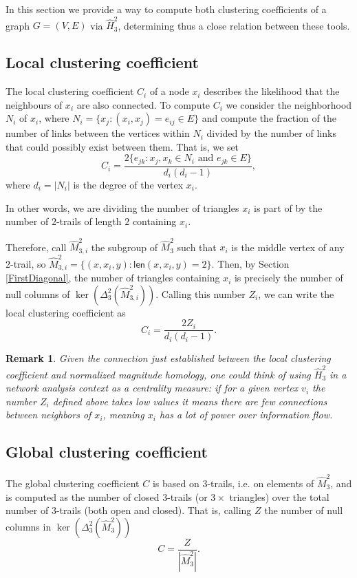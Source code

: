 \documentclass{article}
\newtheorem{remark}{Remark}
\newcommand{\len}{\textsf{len}}
\begin{document}
In this section we provide a way to compute both clustering coefficients of a graph $G=(V,E)$ via $\widehat{H}_3^2$, determining thus a close relation between these tools.


\subsection{Local clustering coefficient}

The local clustering coefficient $C_i$ of a node $x_i$ describes the likelihood that the neighbours of $x_i$ are also connected.
To compute $C_i$ we consider the neighborhood $N_i$ of $x_i$, where $N_i=\{x_j:(x_i,x_j)=e_{ij}\in E\}$ and compute the fraction of the number of links between the vertices within $N_i$ divided by the number of links that could possibly exist between them.
That is, we set
\[
C_i = \frac{2\{e_{jk}:x_j,x_k \in N_i \text{ and } e_{jk}\in E\}}{d_i(d_i -1)},
\]
where $d_i=|N_i|$ is the degree of the vertex $x_i$.

In other words, we are dividing the number of triangles $x_i$ is part of by the number of $2$-trails of length $2$ containing $x_i$.

Therefore, call $\widehat{M}_{3,i}^2$ the subgroup of $\widehat{M}_3^2$ such that $x_i$ is the middle vertex of any $2$-trail, so $\widehat{M}_{3,i}^2=\{(x,x_i,y): \len(x,x_i,y)=2\}$.
Then, by Section \ref{FirstDiagonal}, the number of triangles containing $x_i$ is precisely the number of null columns of $\ker(\Delta_3^2(\widehat{M}_{3,i}^2))$.
Calling this number $Z_i$, we can write the local clustering coefficient as
\[
C_i = \frac{2 Z_i}{d_i(d_i -1)}.
\]

\begin{remark}
	Given the connection just established between the local clustering coefficient and normalized magnitude homology, one could think of using $\widehat{H}_3^2$ in a network analysis context as a \emph{centrality measure}: if for a given vertex $v_i$ the number $Z_i$ defined above takes low values it means there are few connections between neighbors of $x_i$, meaning $x_i$ has a lot of power over information flow. 
\end{remark}


\subsection{Global clustering coefficient}

The global clustering coefficient $C$ is based on $3$-trails, i.e. on elements of $\widehat{M}_3^2$, and is computed as the number of closed $3$-trails (or $3  \times$ triangles) over the total number of $3$-trails (both open and closed).
That is, calling $Z$ the number of null columns in $\ker(\Delta_3^2(\widehat{M}_3^2))$
\[
C = \frac{Z}{|\widehat{M}_3^2|}. 
\]
\end{document}
